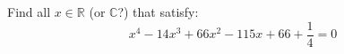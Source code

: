 Find all $x \in \mathbb{R}$ (or $\mathbb{C}$?) that satisfy:
\begin{equation*}
  x^4 - 14 x^3 + 66 x^2 - 115 x + 66 + \frac{1}{4} = 0
\end{equation*}
